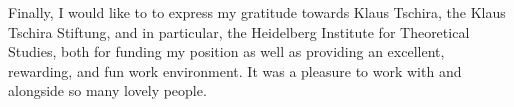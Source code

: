 Finally, I would like to to express my gratitude towards Klaus Tschira, the Klaus Tschira Stiftung,
and in particular, the Heidelberg Institute for Theoretical Studies,
both for funding my position as well as providing an excellent, rewarding, and fun work environment.
It was a pleasure to work with and alongside so many lovely people.





%

